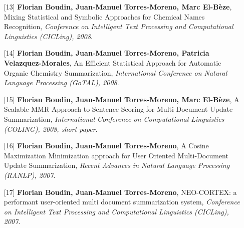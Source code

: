 \documentclass[11pt,a4paper]{moderncv}
\begin{document}
\begin{itemize}[leftmargin=1.2cm,itemsep=0.1cm]
        \item[{\small$[$13$]$}] \textbf{Florian Boudin, Juan-Manuel Torres-Moreno, Marc El-Bèze}, Mixing Statistical and Symbolic Approaches for Chemical Names Recognition, \textit{Conference on Intelligent Text Processing and Computational Linguistics (CICLing), 2008}.
        \item[{\small$[$14$]$}] \textbf{Florian Boudin, Juan-Manuel Torres-Moreno, Patricia Velazquez-Morales}, An Efficient Statistical Approach for Automatic Organic Chemistry Summarization, \textit{International Conference on Natural Language Processing (GoTAL), 2008}.
        \item[{\small$[$15$]$}] \textbf{Florian Boudin, Juan-Manuel Torres-Moreno, Marc El-Bèze}, A Scalable MMR Approach to Sentence Scoring for Multi-Document Update Summarization, \textit{International Conference on Computational Linguistics (COLING), 2008, short paper}.
        \item[{\small$[$16$]$}] \textbf{Florian Boudin, Juan-Manuel Torres-Moreno}, A Cosine Maximization Minimization approach for User Oriented Multi-Document Update Summarization, \textit{Recent Advances in Natural Language Processing (RANLP), 2007}.
        \item[{\small$[$17$]$}] \textbf{Florian Boudin, Juan-Manuel Torres-Moreno}, NEO-CORTEX: a performant user-oriented multi document summarization system, \textit{Conference on Intelligent Text Processing and Computational Linguistics (CICLing), 2007}.
    \end{itemize}
\end{document}

